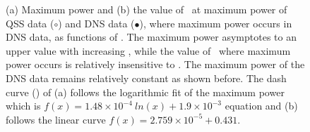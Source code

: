 \begin{figure}
    \caption{(a) Maximum power and (b) the value of \massdamp\ at maximum power of QSS data ($\circ$) and DNS data ($\bullet$), 
        where maximum power occurs in DNS data, as functions of \massstiff.
           The maximum power asymptotes to an upper
        value with increasing \massstiff, while the value of \massdamp\
        where maximum power occurs is relatively insensitive to
        \massstiff. The maximum power of the DNS data remains relatively constant as shown before. The dash curve (\protect\dashedrule) of (a) follows the logarithmic fit of the maximum power which is $f(x)=1.48 \times 10^{-4} \ ln(x) + 1.9 \times 10^{-3} $ equation and (b) follows the linear curve $f(x)= 2.759 \times 10^{-5} + 0.431$.}

    \label{fig:max_power}
\end{figure}

